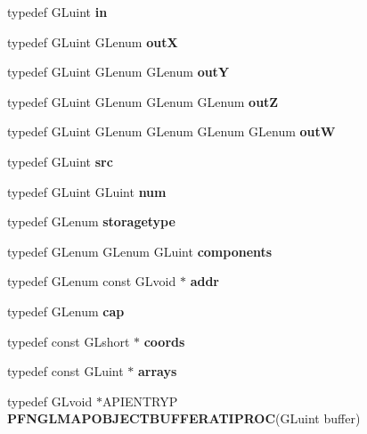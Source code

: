 \begin{DoxyCompactItemize}
\item 
typedef G\+Luint {\bfseries in}\label{_s_d_l__opengl_8h_a83ad0ee7f1e06b59c90271716e689080}

\item 
typedef G\+Luint G\+Lenum {\bfseries out\+X}\label{_s_d_l__opengl_8h_ad456d85656f943078bc66c1814c2c073}

\item 
typedef G\+Luint G\+Lenum G\+Lenum {\bfseries out\+Y}\label{_s_d_l__opengl_8h_ab117d69745dd2957030b968f6ee21c4d}

\item 
typedef G\+Luint G\+Lenum G\+Lenum G\+Lenum {\bfseries out\+Z}\label{_s_d_l__opengl_8h_a8b915d8cb82f30a86d175c6c5f7bb97d}

\item 
typedef G\+Luint G\+Lenum G\+Lenum G\+Lenum G\+Lenum {\bfseries out\+W}\label{_s_d_l__opengl_8h_a96a3a28dfe777a73f4956bdd24eac110}

\item 
typedef G\+Luint {\bfseries src}\label{_s_d_l__opengl_8h_a72e0fdf0f845ded60b1fada9e9195cd7}

\item 
typedef G\+Luint G\+Luint {\bfseries num}\label{_s_d_l__opengl_8h_abb50fc1ead3a02a46fb52daa2045f95c}

\item 
typedef G\+Lenum {\bfseries storagetype}\label{_s_d_l__opengl_8h_a13d471aa004dfa78f74afa760f89d4a2}

\item 
typedef G\+Lenum G\+Lenum G\+Luint {\bfseries components}\label{_s_d_l__opengl_8h_a452b9ab10170c96a9bef2657c036a2c0}

\item 
typedef G\+Lenum const G\+Lvoid $\ast$ {\bfseries addr}\label{_s_d_l__opengl_8h_a992d3255fe3323885b064097997f4c95}

\item 
typedef G\+Lenum {\bfseries cap}\label{_s_d_l__opengl_8h_ae22de5a430ce81d57d8140824a3e10dc}

\item 
typedef const G\+Lshort $\ast$ {\bfseries coords}\label{_s_d_l__opengl_8h_a84609a7641d05359c95bd5d3ace5a4d3}

\item 
typedef const G\+Luint $\ast$ {\bfseries arrays}\label{_s_d_l__opengl_8h_a53c4d044199cb7ba908d02f46dc10ea5}

\item 
typedef G\+Lvoid $\ast$A\+P\+I\+E\+N\+T\+R\+Y\+P {\bfseries P\+F\+N\+G\+L\+M\+A\+P\+O\+B\+J\+E\+C\+T\+B\+U\+F\+F\+E\+R\+A\+T\+I\+P\+R\+O\+C}(G\+Luint buffer)\label{_s_d_l__opengl_8h_aa0b60df0da216e1ac120e33601c6a219}


\end{DoxyCompactItemize}
